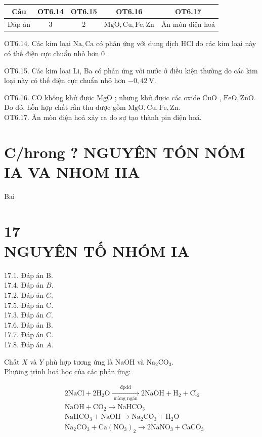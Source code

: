 \documentclass[10pt]{article}
\begin{document}
\begin{center}
\begin{tabular}{|c|c|c|c|c|}
\hline
Câu & OT6.14 & OT6.15 & OT6.16 & OT6.17 \\
\hline
Đáp án & 3 & 2 & $\mathrm{MgO}, \mathrm{Cu}, \mathrm{Fe}, \mathrm{Zn}$ & Ăn mòn điện hoá \\
\hline
\end{tabular}
\end{center}

OT6.14. Các kim loại $\mathrm{Na}, \mathrm{Ca}$ có phản ứng với dung dịch HCl do các kim loại này có thế điện cực chuẩn nhỏ hơn 0 .

OT6.15. Các kim loại Li, Ba có phản ứng với nước ở điều kiện thường do các kim loại này có thế điện cực chuẩn nhỏ hơn $-0,42 \mathrm{~V}$.

OT6.16. CO không khử được MgO ; nhưng khử được các oxide CuO , $\mathrm{FeO}, \mathrm{ZnO}$. Do đó, hỗn hợp chất rắn thu được gồm $\mathrm{MgO}, \mathrm{Cu}, \mathrm{Fe}, \mathrm{Zn}$.\\
OT6.17. Ăn mòn điện hoá xảy ra do sự tạo thành pin điện hoá.

\section*{C/hrong ? NGUYÊN TÓN NÓM IA VA NHOM IIA}
Bai

\section*{17 \\
 NGUYÊN TỐ NHÓM IA}
17.1. Đáp án B.\\
17.4. Đáp án $B$.\\
17.2. Đáp án $C$.\\
17.5. Đáp án C.\\
17.3. Đáp án $C$.\\
17.6. Đáp án B.\\
17.7. Đáp án C.\\
17.8. Đáp án $A$.

Chất $X$ và $Y$ phù hợp tương ứng là NaOH và $\mathrm{Na}_{2} \mathrm{CO}_{3}$.\\
Phương trình hoá học của các phản ứng:

$$
\begin{aligned}
& 2 \mathrm{NaCl}+2 \mathrm{H}_{2} \mathrm{O} \xrightarrow[\text { màng ngăn }]{\text { đpdd }} 2 \mathrm{NaOH}+\mathrm{H}_{2}+\mathrm{Cl}_{2} \\
& \mathrm{NaOH}+\mathrm{CO}_{2} \rightarrow \mathrm{NaHCO}_{3} \\
& \mathrm{NaHCO}_{3}+\mathrm{NaOH} \rightarrow \mathrm{Na}_{2} \mathrm{CO}_{3}+\mathrm{H}_{2} \mathrm{O} \\
& \mathrm{Na}_{2} \mathrm{CO}_{3}+\mathrm{Ca}\left(\mathrm{NO}_{3}\right)_{2} \rightarrow 2 \mathrm{NaNO}_{3}+\mathrm{CaCO}_{3}
\end{aligned}
$$
\end{document}
